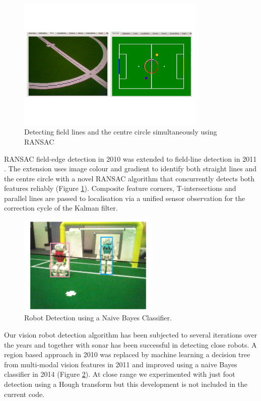 \documentclass[runningheads,a4paper]{llncs}
\begin{document}
\begin{figure} [h]
\centering
\includegraphics[width=0.8\textwidth]{Figures/figLineCircleRANSAC}
\caption{Detecting field lines and the centre circle simultaneously using RANSAC} 
\label{figLineCircleRANSAC}
\end{figure}

RANSAC field-edge detection in 2010 was extended to field-line detection in 2011 \cite{harris2011featureransac}. The extension uses image colour and gradient to identify both straight lines and the centre circle with a novel RANSAC algorithm that concurrently detects both features reliably (Figure \ref{figLineCircleRANSAC}). Composite feature corners, T-intersections and parallel lines are passed to localisation via a unified sensor observation for the correction cycle of the Kalman filter. 

\begin{figure} [h]
\centering
\includegraphics[width=0.6\textwidth]{Figures/figRobotDetection}
\caption{Robot Detection using a Naive Bayes Classifier.} 
\label{figRobotDetection}
\end{figure}

Our vision robot detection algorithm has been subjected to several iterations over the years and together with sonar has been successful in detecting close robots. A region based approach in 2010 \cite{cse10rUNSWift2010} was replaced by machine learning a decision tree from multi-modal vision features in 2011 \cite{kurniawan2011modalrobotdetection} and improved using a naive Bayes classifier in 2014  \cite{ashmore2014robotdetection} (Figure \ref{figRobotDetection}). At close range we experimented with just foot detection using a Hough transform \cite{youssef2011industrial} but this development is not included in the current code.
\end{document}
